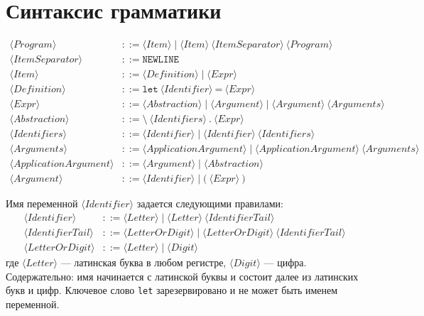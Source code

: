 \documentclass{article}
\begin{document}
\section{Синтаксис грамматики}

\begin{align*}
    \langle Program \rangle    &::= \langle Item \rangle \mid \langle Item \rangle \ \langle ItemSeparator \rangle \ \langle Program \rangle \\
    \langle ItemSeparator \rangle &::= \texttt{NEWLINE} \\
    \langle Item \rangle       &::= \langle Definition \rangle \mid \langle Expr \rangle \\
    \langle Definition \rangle &::= \texttt{let} \ \langle Identifier \rangle \ \texttt{=} \ \langle Expr \rangle \\
    \langle Expr \rangle       &::= \langle Abstraction \rangle \mid \langle Argument \rangle \mid \langle Argument \rangle \ \langle Arguments \rangle \\
    \langle Abstraction \rangle &::= \texttt{\textbackslash} \ \langle Identifiers \rangle \ \texttt{.} \ \langle Expr \rangle \\
    \langle Identifiers \rangle &::= \langle Identifier \rangle \mid \langle Identifier \rangle \ \langle Identifiers \rangle \\
    \langle Arguments \rangle  &::= \langle ApplicationArgument \rangle \mid \langle ApplicationArgument \rangle \ \langle Arguments \rangle \\
    \langle ApplicationArgument \rangle &::= \langle Argument \rangle \mid \langle Abstraction \rangle \\
    \langle Argument \rangle   &::= \langle Identifier \rangle \mid \texttt{(} \ \langle Expr \rangle \ \texttt{)}
\end{align*}

Имя переменной $\langle Identifier \rangle$ задается следующими правилами:
\begin{align*}
    \langle Identifier \rangle &::= \langle Letter \rangle \mid \langle Letter \rangle \ \langle IdentifierTail \rangle \\
    \langle IdentifierTail \rangle &::= \langle LetterOrDigit \rangle \mid \langle LetterOrDigit \rangle \ \langle IdentifierTail \rangle \\
    \langle LetterOrDigit \rangle &::= \langle Letter \rangle \mid \langle Digit \rangle
\end{align*}
где $\langle Letter \rangle$ --- латинская буква в любом регистре, $\langle Digit \rangle$ --- цифра.
Содержательно: имя начинается с латинской буквы и состоит далее из латинских букв и цифр.
Ключевое слово \texttt{let} зарезервировано и не может быть именем переменной.
\end{document}
